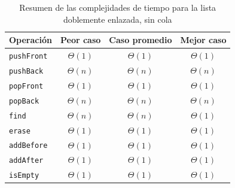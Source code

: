 \begin{table}[htbp]
  \centering{}
  \begin{tabular}{lccc}
    \toprule
    Operación & Peor caso & Caso promedio & Mejor caso \\
    \midrule
    \texttt{pushFront} & $\Theta{} (1)$ & $\Theta{} (1)$ & $\Theta{} (1)$ \\
    \texttt{pushBack} & $\Theta{} (n)$ & $\Theta{} (n)$ & $\Theta{} (n)$ \\
    \texttt{popFront} & $\Theta{} (1)$ & $\Theta{} (1)$ & $\Theta{} (1)$ \\
    \texttt{popBack} & $\Theta{} (n)$ & $\Theta{} (n)$ & $\Theta{} (n)$ \\
    \texttt{find} & $\Theta{} (n)$ & $\Theta{} (n)$ & $\Theta{} (1)$ \\
    \texttt{erase} & $\Theta{} (1)$ & $\Theta{} (1)$ & $\Theta{} (1)$ \\
    \texttt{addBefore} & $\Theta{} (1)$ & $\Theta{} (1)$ & $\Theta{} (1)$ \\
    \texttt{addAfter} & $\Theta{} (1)$ & $\Theta{} (1)$ & $\Theta{} (1)$ \\
    \texttt{isEmpty} & $\Theta{} (1)$ & $\Theta{} (1)$ & $\Theta{} (1)$ \\
    \bottomrule
  \end{tabular}
  \caption{Resumen de las complejidades de tiempo para la lista doblemente enlazada, sin cola}
  \label{tab:resumen-doble-sin-cola}
\end{table}

